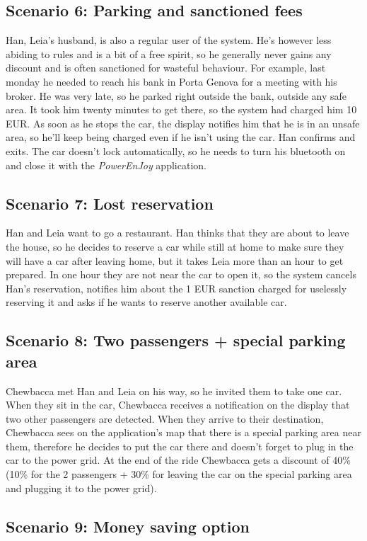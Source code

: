 \subsection{Scenario 6: Parking and sanctioned fees}
	Han, Leia's husband, is also a regular user of the system. He's however less abiding to rules and is a bit of a free spirit, so he generally never gains any discount and is often sanctioned for wasteful behaviour. For example, last monday he needed to reach his bank in Porta Genova for a meeting with his broker. He was very late, so he parked right outside the bank, outside any safe area. It took him twenty minutes to get there, so the system had charged him 10 EUR. As soon as he stops the car, the display notifies him that he is in an unsafe area, so he'll keep being charged even if he isn't using the car. Han confirms and exits. The car doesn't lock automatically, so he needs to turn his bluetooth on and close it with the \textit{PowerEnJoy} application. 

\subsection{Scenario 7: Lost reservation}
	Han and Leia want to go a restaurant. Han thinks that they are about to leave the house, so he decides to reserve a car while still at home to make sure they will have a car after leaving home, but it takes Leia more than an hour to get prepared. In one hour they are not near the car to open it, so the system cancels Han's reservation, notifies him about the 1 EUR sanction charged for uselessly reserving it and asks if he wants to reserve another available car.    	
	
\subsection{Scenario 8: Two passengers + special parking area}
	Chewbacca met Han and Leia on his way, so he invited them to take one car. When they sit in the car, Chewbacca receives a notification on the display that two other passengers are detected. When they arrive to their destination, Chewbacca sees on the application's map that there is a special parking area near them, therefore he decides to put the car there and doesn't forget to plug in the car to the power grid. At the end of the ride Chewbacca gets a discount of 40\% (10\% for the 2 passengers + 30\% for leaving the car on the special parking area and plugging it to the power grid).  
	
\subsection{Scenario 9: Money saving option}


